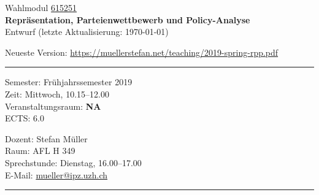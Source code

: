\documentclass[abstract=on,parskip=full,headings=standardclasses,fontsize=11pt,paper=a4]{scrartcl}
\begin{document}
	
\singlespacing


\noindent
{}%
\hfill%

\singlespacing
\vspace{1cm}

\begin{center}
{\large Wahlmodul \href{https://studentservices.uzh.ch/uzh/anonym/vvz/index.html#/details/2018/004/E/50926420}{615251}} \\ 
\medskip
{\Large \textbf{Repräsentation, Parteienwettbewerb und Policy-Analyse}} \\
\bigskip
{\large  Entwurf (letzte Aktualisierung: \today)}

Neueste Version: \url{https://muellerstefan.net/teaching/2019-spring-rpp.pdf}
\end{center}

\vspace{1.5cm}

\hrule
\medskip
\begin{minipage}[t]{0.5\textwidth}
Semester: Frühjahrssemester 2019 \\
Zeit: Mittwoch, 10.15--12.00 \\
Veranstaltungsraum:  \textbf{NA}\\
ECTS: 6.0
\end{minipage}
\begin{minipage}[t]{0.49\textwidth}
\begin{flushright}
Dozent: Stefan Müller \\
Raum: AFL H 349\\
Sprechstunde: Dienstag, 16.00--17.00 \\
E-Mail: \textsf{\href{mailto:mueller@ipz.uzh.ch}{mueller@ipz.uzh.ch}}
\end{flushright}
\end{minipage}
\medskip
\vspace{2.5mm}
\hrule 
\end{document}
